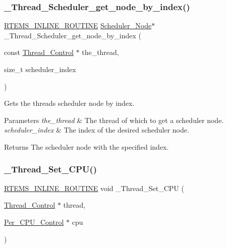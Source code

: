 \subsubsection{\texorpdfstring{\_Thread\_Scheduler\_get\_node\_by\_index()}{\_Thread\_Scheduler\_get\_node\_by\_index()}}
{\footnotesize\ttfamily \mbox{\hyperlink{group__RTEMSScoreBaseDefs_gac216239df231d5dbd15e3520b0b9313f}{R\+T\+E\+M\+S\+\_\+\+I\+N\+L\+I\+N\+E\+\_\+\+R\+O\+U\+T\+I\+NE}} \mbox{\hyperlink{structScheduler__Node}{Scheduler\+\_\+\+Node}}$\ast$ \+\_\+\+Thread\+\_\+\+Scheduler\+\_\+get\+\_\+node\+\_\+by\+\_\+index (\begin{DoxyParamCaption}\item[{const \mbox{\hyperlink{struct__Thread__Control}{Thread\+\_\+\+Control}} $\ast$}]{the\+\_\+thread,  }\item[{size\+\_\+t}]{scheduler\+\_\+index }\end{DoxyParamCaption})}



Gets the thread\textquotesingle{}s scheduler node by index. 


\begin{DoxyParams}{Parameters}
{\em the\+\_\+thread} & The thread of which to get a scheduler node. \\
\hline
{\em scheduler\+\_\+index} & The index of the desired scheduler node.\\
\hline
\end{DoxyParams}
\begin{DoxyReturn}{Returns}
The scheduler node with the specified index. 
\end{DoxyReturn}
\mbox{\label{group__RTEMSScoreThread_ga47858fc4679031e1dedcc3188fd79589}} 
\subsubsection{\texorpdfstring{\_Thread\_Set\_CPU()}{\_Thread\_Set\_CPU()}}
{\footnotesize\ttfamily \mbox{\hyperlink{group__RTEMSScoreBaseDefs_gac216239df231d5dbd15e3520b0b9313f}{R\+T\+E\+M\+S\+\_\+\+I\+N\+L\+I\+N\+E\+\_\+\+R\+O\+U\+T\+I\+NE}} void \+\_\+\+Thread\+\_\+\+Set\+\_\+\+C\+PU (\begin{DoxyParamCaption}\item[{\mbox{\hyperlink{struct__Thread__Control}{Thread\+\_\+\+Control}} $\ast$}]{thread,  }\item[{\mbox{\hyperlink{structPer__CPU__Control}{Per\+\_\+\+C\+P\+U\+\_\+\+Control}} $\ast$}]{cpu }\end{DoxyParamCaption})}



